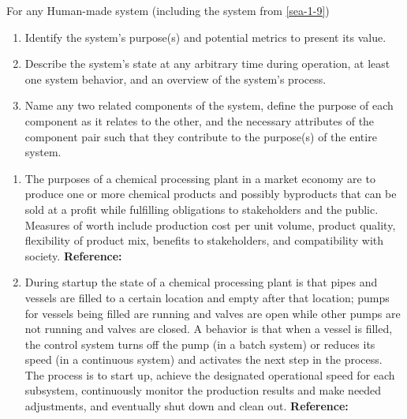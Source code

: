 \begin{exercises}
    \begin{exercise} 
    \label{sea-1-10_11_12}
        For any Human-made system (including the system from \ref{sea-1-9})
        \begin{enumerate}[label=\alph*)]
            \item Identify the system's purpose(s) and potential metrics to present its value.
            \item Describe the system's state at any arbitrary time during operation, at least one system behavior, and an overview of the system's process.
            \item Name any two related components of the system, define the purpose of each component as it relates to the other, and the necessary attributes of the component pair such that they contribute to the purpose(s) of the entire system.
        \end{enumerate}
    \end{exercise}
    \begin{solution}
        \begin{enumerate}[label=\alph*)]
            \item The purposes of a chemical processing plant in a market economy are to produce one or more chemical products and possibly byproducts that can be sold at a profit while fulfilling obligations to stakeholders and the public. Measures of worth include production cost per unit volume, product quality, flexibility of product mix, benefits to stakeholders, and compatibility with society. \textbf{Reference:}
            \item During startup the state of a chemical processing plant is that pipes and vessels are filled to a certain location and empty after that location; pumps for vessels being filled are running and valves are open while other pumps are not running and valves are closed. A behavior is that when a vessel is filled, the control system turns off the pump (in a batch system) or reduces its speed (in a continuous system) and activates the next step in the process. The process is to start up, achieve the designated operational speed for each subsystem, continuously monitor the production results and make needed adjustments, and eventually shut down and clean out. \textbf{Reference:}

\end{enumerate}
\end{solution}
\end{exercises}

